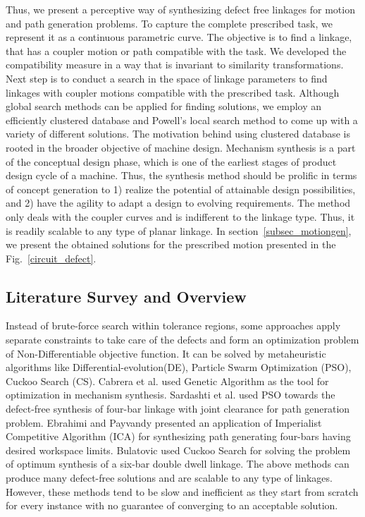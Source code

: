 \documentclass[twocolumn,10pt]{asme2ej}
\begin{document}
Thus, we present a perceptive way of synthesizing defect free linkages for motion and path generation problems.
To capture the complete prescribed task, we represent it as a continuous parametric curve.
The objective is to find a linkage, that has a coupler motion or path compatible with the task.
We developed the compatibility measure in a way that is invariant to similarity transformations.
Next step is to conduct a search in the space of linkage parameters to find linkages with coupler motions compatible with the prescribed task.
Although global search methods can be applied for finding solutions, we employ an efficiently clustered database and Powell's local search method to come up with a variety of different solutions.
The motivation behind using clustered database is rooted in the broader objective of machine design.
Mechanism synthesis is a part of the conceptual design phase, which is one of the earliest stages of product design cycle of a machine.
Thus, the synthesis method should be prolific in terms of concept generation to 1) realize the potential of attainable design possibilities, and 2) have the agility to adapt a design to evolving requirements.
The method only deals with the coupler curves and is indifferent to the linkage type.
Thus, it is readily scalable to any type of planar linkage.
In section~\ref{subsec_motiongen}, we present the obtained solutions for the prescribed motion presented in the Fig.~\ref{circuit_defect}.

\subsection{Literature Survey and Overview}
Instead of brute-force search within tolerance regions, some approaches apply separate constraints to take care of the defects and form an optimization problem of Non-Differentiable objective function.
It can be solved by metaheuristic algorithms like Differential-evolution(DE), Particle Swarm Optimization (PSO), Cuckoo Search (CS).
Cabrera et al.\cite{Cabrera2002} used Genetic Algorithm as the tool for optimization in mechanism synthesis.
Sardashti et al.\cite{sardashti2013} used PSO towards the defect-free synthesis of four-bar linkage with joint clearance for path generation problem.
Ebrahimi and Payvandy\cite{Ebrahimi2015} presented an application of Imperialist Competitive Algorithm (ICA) for synthesizing path generating four-bars having desired workspace limits.
Bulatovic\cite{Bulatovic2013} used Cuckoo Search for solving the problem of optimum synthesis of a six-bar double dwell linkage.
The above methods can produce many defect-free solutions and are scalable to any type of linkages.
However, these methods tend to be slow and inefficient as they start from scratch for every instance with no guarantee of converging to an acceptable solution.
\end{document}
